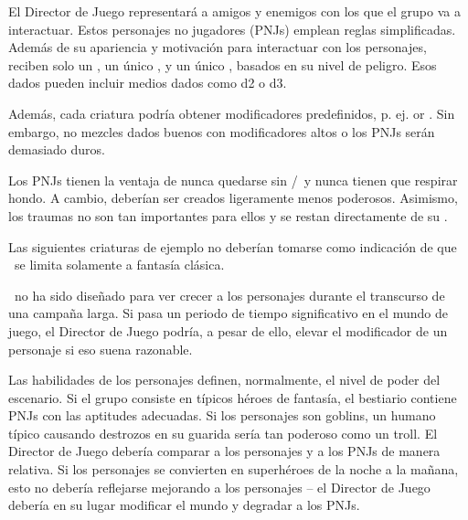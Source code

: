 {	

		\noindent
		El Director de Juego representará a amigos y enemigos con los que el grupo va a interactuar. Estos personajes no jugadores (PNJs) emplean reglas simplificadas. Además de su apariencia y motivación para interactuar con los personajes, reciben solo un \HD, un único \AD, y un único \RD, basados en su nivel de peligro. Esos dados pueden incluir medios dados como d2 o d3.

		\nipajinTableNSC

		\noindent
		Además, cada criatura podría obtener modificadores predefinidos, p. ej.  or . Sin embargo, no mezcles dados buenos con modificadores altos o los PNJs serán demasiado duros.

		Los PNJs tienen la ventaja de nunca quedarse sin \AD/\RD\ y nunca tienen que respirar hondo. A cambio, deberían ser creados ligeramente menos poderosos. Asimismo, los traumas no son tan importantes para ellos y se restan directamente de su \HD.


		\noindent
		Las siguientes criaturas de ejemplo no deberían tomarse como indicación de que \nipajin\ se limita solamente a fantasía clásica.

		\nipajinTableBestiary


		\noindent
		\nipajin\ no ha sido diseñado para ver crecer a los personajes durante el transcurso de una campaña larga. Si pasa un periodo de tiempo significativo en el mundo de juego, el Director de Juego podría, a pesar de ello, elevar el modificador de un personaje si eso suena razonable.

		Las habilidades de los personajes definen, normalmente, el nivel de poder del escenario. Si el grupo consiste en típicos héroes de fantasía, el bestiario contiene PNJs con las aptitudes adecuadas. Si los personajes son goblins, un humano típico causando destrozos en su guarida sería tan poderoso como un troll. El Director de Juego debería comparar a los personajes y a los PNJs de manera relativa. Si los personajes se convierten en superhéroes de la noche a la mañana, esto no debería reflejarse mejorando a los personajes -- el Director de Juego debería en su lugar modificar el mundo y degradar a los PNJs.

}
